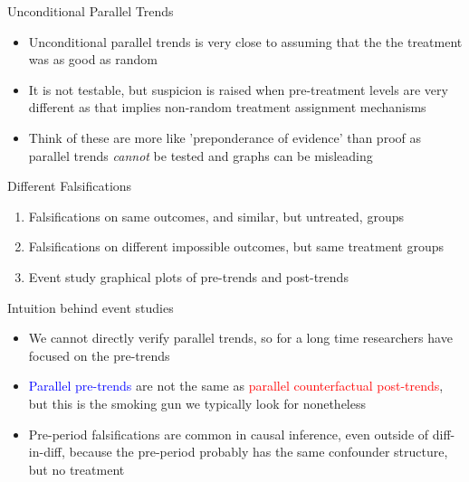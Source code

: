 \documentclass{beamer}
\begin{document}
\begin{frame}{Unconditional Parallel Trends}

\begin{itemize}
\item Unconditional parallel trends is very close to assuming that the the treatment was as good as random
\item It is not testable, but suspicion is raised when pre-treatment levels are very different as that implies non-random treatment assignment mechanisms
\item Think of these are more like 'preponderance of evidence' than proof as parallel trends \emph{cannot} be tested and graphs can be misleading
\end{itemize}


\end{frame}


\begin{frame}{Different Falsifications}

	\begin{enumerate}
	\item Falsifications on same outcomes, and similar, but untreated, groups
	\item Falsifications on different impossible outcomes, but same treatment groups
	\item Event study graphical plots of pre-trends and post-trends
	\end{enumerate}


\end{frame}


\begin{frame}{Intuition behind event studies}

\begin{itemize}

	\item We cannot directly verify parallel trends, so for a long time researchers have focused on the pre-trends
	\item \textcolor{blue}{Parallel pre-trends} are not the same as \textcolor{red}{parallel counterfactual post-trends}, but this is the smoking gun we typically look for nonetheless
	\item Pre-period falsifications are common in causal inference, even outside of diff-in-diff, because the pre-period probably has the same confounder structure, but no treatment

\end{itemize}

\end{frame}
\end{document}
